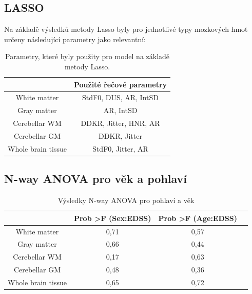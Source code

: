 \documentclass[11pt,a4paper]{article}
\begin{document}
        \subsection{LASSO}
            Na základě výsledků metody Lasso byly pro jednotlivé typy mozkových hmot určeny následující parametry jako relevantní:
            \begin{table}[!ht]
                \centering
                \begin{tabular}{c|c}
                    & Použité řečové parametry \\
                    \hline
                    White matter & StdF0, DUS, AR, IntSD \\
                    Gray matter & AR, IntSD \\
                    Cerebellar WM & DDKR, Jitter, HNR, AR \\
                    Cerebellar GM & DDKR, Jitter \\
                    Whole brain tissue & StdF0, Jitter, AR \\
                \end{tabular}
                \caption{Parametry, které byly použity pro model na základě metody Lasso.}
                \label{tab:lasso}
            \end{table}
         
        \subsection{N-way ANOVA pro věk a pohlaví}
            \begin{table}[hbtp]
                \centering
                \begin{tabular}{c|c|c|l}
                                   & Prob \textgreater F (Sex:EDSS) & Prob \textgreater F (Age:EDSS) &  \\ 
                                   \hline
                White matter       & 0,71          & 0,57  \\                     
                Gray matter        & 0,66          & 0,44  \\                 
                Cerebellar WM      & 0,17         & 0,63     \\                  
                Cerebellar GM      & 0,48          & 0,36      \\           
                Whole brain tissue & 0,65           & 0,72       \\                  
                \end{tabular}
                \caption{Výsledky N-way ANOVA pro pohlaví a věk}
                \label{tab:anovy}
            \end{table}
            
\end{document}
